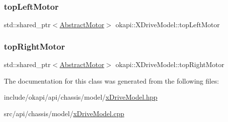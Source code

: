 \mbox{\label{classokapi_1_1XDriveModel_a7fd97da22c4f052efd49e7c7554409aa}} 
\subsubsection{\texorpdfstring{topLeftMotor}{topLeftMotor}}
{\footnotesize\ttfamily std\+::shared\+\_\+ptr$<$\mbox{\hyperlink{classokapi_1_1AbstractMotor}{Abstract\+Motor}}$>$ okapi\+::\+X\+Drive\+Model\+::top\+Left\+Motor\hspace{0.3cm}{\ttfamily [protected]}}

\mbox{\label{classokapi_1_1XDriveModel_abe393384e83737181b5b836d99b0a480}} 
\subsubsection{\texorpdfstring{topRightMotor}{topRightMotor}}
{\footnotesize\ttfamily std\+::shared\+\_\+ptr$<$\mbox{\hyperlink{classokapi_1_1AbstractMotor}{Abstract\+Motor}}$>$ okapi\+::\+X\+Drive\+Model\+::top\+Right\+Motor\hspace{0.3cm}{\ttfamily [protected]}}



The documentation for this class was generated from the following files\+:\begin{DoxyCompactItemize}
\item 
include/okapi/api/chassis/model/\mbox{\hyperlink{xDriveModel_8hpp}{x\+Drive\+Model.\+hpp}}\item 
src/api/chassis/model/\mbox{\hyperlink{xDriveModel_8cpp}{x\+Drive\+Model.\+cpp}}\end{DoxyCompactItemize}
